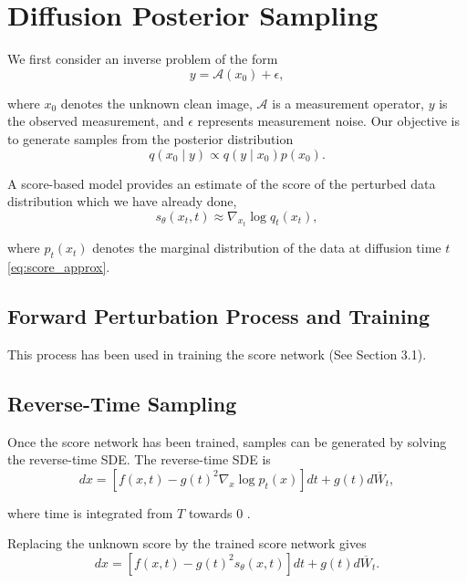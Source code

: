 \documentclass[12pt,a4paper]{report}
\begin{document}
\section{Diffusion Posterior Sampling}
We first consider an inverse problem of the form
\begin{equation}
    y = \mathcal{A}(x_0) + \epsilon,
\end{equation}

\noindent
where $x_0$ denotes the unknown clean image, $\mathcal{A}$ is a measurement operator, $y$ is the observed measurement, and $\epsilon$ represents measurement noise. Our  objective is to generate samples from the posterior distribution
\begin{equation}
    q(x_0 \mid y)
    \propto
    q(y \mid x_0)p(x_0).
\end{equation}

\noindent
A score-based model provides an estimate of the score of the perturbed data distribution which we have already done,
\begin{equation}
    s_\theta(x_t,t)
    \approx
    \nabla_{x_t}\log q_t(x_t),
\end{equation}

\noindent
where $p_t(x_t)$ denotes the marginal distribution of the data at diffusion time $t$ \ref{eq:score_approx}.

\subsection{Forward Perturbation Process and Training}
This process has been used in training the score network (See Section 3.1). 

\subsection{Reverse-Time Sampling}
Once the score network has been trained, samples can be generated by solving the reverse-time SDE. The reverse-time SDE is
\begin{equation}
    dx
    =
    \left[
    f(x,t)-g(t)^2
    \nabla_x\log p_t(x)
    \right]dt
    +
    g(t)d\overline{W}_t,
\end{equation}

\noindent
where time is integrated from $T$ towards $0$ \cite{song2021scorebasedgenerativemodelingstochastic}.

\vspace{0.3cm}
\noindent
Replacing the unknown score by the trained score network gives
\begin{equation}
    dx
    =
    \left[
    f(x,t)-g(t)^2s_\theta(x,t)
    \right]dt
    +
    g(t)d\overline{W}_t.
\end{equation}
\end{document}
